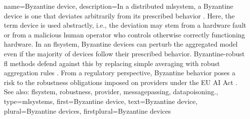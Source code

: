 {name={Byzantine device},
	description={In a distributed \gls{mlsystem}, a Byzantine \gls{device} 
		is one that deviates arbitrarily from its prescribed behavior \cite{Lamport1982}.
		Here, the term \gls{device} is used abstractly, i.e., the deviation may stem
		from a hardware fault or from a malicious human operator
		who controls otherwise correctly functioning hardware.
		In an \gls{flsystem}, Byzantine \glspl{device} can perturb
		the aggregated \gls{model} even if the majority of \glspl{device}
		follow their prescribed behavior. 
		Byzantine-robust \gls{fl} methods defend against this by 
		replacing simple averaging with robust aggregation rules \cite{NIPS2017_f4b9ec30}.
		From a regulatory perspective, Byzantine behavior poses a \gls{risk}
		to the \gls{robustness} obligations imposed on \glspl{provider}
		under the EU AI Act \cite{EUAIAct2024}.
		\\
		See also: \gls{flsystem}, \gls{robustness}, \gls{provider},
		\gls{messagepassing}, \gls{datapoisoning}.},
	type=mlsystems,
	first={Byzantine device},
	text={Byzantine device},
	plural={Byzantine devices},
	firstplural={Byzantine devices}
}

